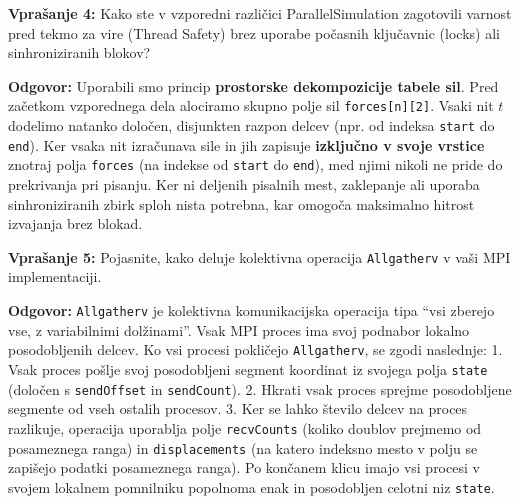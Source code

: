 \documentclass[11pt,a4paper]{article}
\begin{document}
\begin{vprasanje}
\textbf{Vprašanje 4:} Kako ste v vzporedni različici ParallelSimulation zagotovili varnost pred tekmo za vire (Thread Safety) brez uporabe počasnih ključavnic (locks) ali sinhroniziranih blokov?

\textbf{Odgovor:}
Uporabili smo princip \textbf{prostorske dekompozicije tabele sil}. Pred začetkom vzporednega dela alociramo skupno polje sil \texttt{forces[n][2]}. Vsaki nit $t$ dodelimo natanko določen, disjunkten razpon delcev (npr. od indeksa \texttt{start} do \texttt{end}). 
Ker vsaka nit izračunava sile in jih zapisuje \textbf{izključno v svoje vrstice} znotraj polja \texttt{forces} (na indekse od \texttt{start} do \texttt{end}), med njimi nikoli ne pride do prekrivanja pri pisanju. Ker ni deljenih pisalnih mest, zaklepanje ali uporaba sinhroniziranih zbirk sploh nista potrebna, kar omogoča maksimalno hitrost izvajanja brez blokad.
\end{vprasanje}

\begin{vprasanje}
\textbf{Vprašanje 5:} Pojasnite, kako deluje kolektivna operacija \texttt{Allgatherv} v vaši MPI implementaciji.

\textbf{Odgovor:}
\texttt{Allgatherv} je kolektivna komunikacijska operacija tipa ``vsi zberejo vse, z variabilnimi dolžinami''. Vsak MPI proces ima svoj podnabor lokalno posodobljenih delcev.
Ko vsi procesi pokličejo \texttt{Allgatherv}, se zgodi naslednje:
1. Vsak proces pošlje svoj posodobljeni segment koordinat iz svojega polja \texttt{state} (določen s \texttt{sendOffset} in \texttt{sendCount}).
2. Hkrati vsak proces sprejme posodobljene segmente od vseh ostalih procesov.
3. Ker se lahko \v{s}tevilo delcev na proces razlikuje, operacija uporablja polje \texttt{recvCounts} (koliko doublov prejmemo od posameznega ranga) in \texttt{displacements} (na katero indeksno mesto v polju se zapišejo podatki posameznega ranga).
Po končanem klicu imajo vsi procesi v svojem lokalnem pomnilniku popolnoma enak in posodobljen celotni niz \texttt{state}.
\end{vprasanje}
\end{document}
